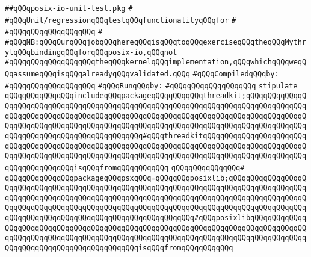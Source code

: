 \label{src/lib/std/src/psx/posix-io-unit-test.pkg}
\verb|##qQQqposix-io-unit-test.pkg|\newline
\verb|#|\newline
\verb|#qQQqUnit/regressionqQQqtestqQQqfunctionalityqQQqfor|\newline
\verb|#|\newline
\verb|#qQQqqQQqqQQqqQQqqQQq|\newline
\verb|#|\newline
\verb|#qQQqNB:qQQqOurqQQqjobqQQqhereqQQqisqQQqtoqQQqexerciseqQQqtheqQQqMythrylqQQqbindingqQQqforqQQqposix-io,qQQqnot|\newline
\verb|#qQQqqQQqqQQqqQQqqQQqtheqQQqkernelqQQqimplementation,qQQqwhichqQQqweqQQqassumeqQQqisqQQqalreadyqQQqvalidated.qQQq|\newline
\newline
\verb|#qQQqCompiledqQQqby:|\newline
\verb|#qQQqqQQqqQQqqQQqqQQq|\newline
\newline
\verb|#qQQqRunqQQqby:|\newline
\verb|#qQQqqQQqqQQqqQQqqQQq|\newline
\newline
\newline
\verb|stipulate|\newline
\verb|qQQqqQQqqQQqqQQqincludeqQQqpackageqQQqqQQqqQQqthreadkit;qQQqqQQqqQQqqQQqqQQqqQQqqQQqqQQqqQQqqQQqqQQqqQQqqQQqqQQqqQQqqQQqqQQqqQQqqQQqqQQqqQQqqQQqqQQqqQQqqQQqqQQqqQQqqQQqqQQqqQQqqQQqqQQqqQQqqQQqqQQqqQQqqQQqqQQqqQQqqQQqqQQqqQQqqQQqqQQqqQQqqQQqqQQqqQQqqQQqqQQqqQQqqQQqqQQqqQQqqQQqqQQqqQQqqQQqqQQqqQQqqQQqqQQqqQQqqQQq#qQQqthreadkitqQQqqQQqqQQqqQQqqQQqqQQqqQQqqQQqqQQqqQQqqQQqqQQqqQQqqQQqqQQqqQQqqQQqqQQqqQQqqQQqqQQqqQQqqQQqqQQqqQQqqQQqqQQqqQQqqQQqqQQqqQQqqQQqqQQqqQQqqQQqqQQqqQQqqQQqqQQqqQQqqQQqqQQqqQQqqQQqqQQqisqQQqfromqQQqqQQqqQQq|\newline
\verb|qQQqqQQqqQQqqQQq#|\newline
\verb|qQQqqQQqqQQqqQQqpackageqQQqpsxqQQq=qQQqqQQqposixlib;qQQqqQQqqQQqqQQqqQQqqQQqqQQqqQQqqQQqqQQqqQQqqQQqqQQqqQQqqQQqqQQqqQQqqQQqqQQqqQQqqQQqqQQqqQQqqQQqqQQqqQQqqQQqqQQqqQQqqQQqqQQqqQQqqQQqqQQqqQQqqQQqqQQqqQQqqQQqqQQqqQQqqQQqqQQqqQQqqQQqqQQqqQQqqQQqqQQqqQQqqQQqqQQqqQQqqQQqqQQqqQQqqQQqqQQqqQQqqQQqqQQqqQQqqQQqqQQqqQQqqQQqqQQqqQQq#qQQqposixlibqQQqqQQqqQQqqQQqqQQqqQQqqQQqqQQqqQQqqQQqqQQqqQQqqQQqqQQqqQQqqQQqqQQqqQQqqQQqqQQqqQQqqQQqqQQqqQQqqQQqqQQqqQQqqQQqqQQqqQQqqQQqqQQqqQQqqQQqqQQqqQQqqQQqqQQqqQQqqQQqqQQqqQQqqQQqqQQqqQQqqQQqisqQQqfromqQQqqQQqqQQq|\newline
